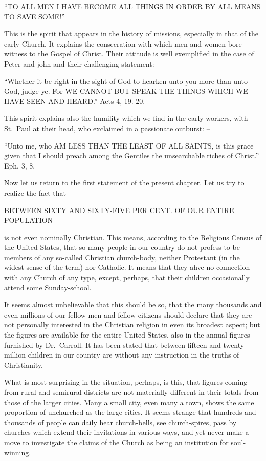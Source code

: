 \documentclass[
]{book}
\begin{document}
``TO ALL MEN I HAVE BECOME ALL THINGS IN ORDER BY ALL MEANS TO SAVE SOME!''

This is the spirit that appears in the history of missions, especially in that of the early Church. It explains the consecration with which men and women bore witness to the Gospel of Christ. Their attitude is well exemplified in the case of Peter and john and their challenging statement: --

``Whether it be right in the sight of God to hearken unto you more than unto God, judge ye. For WE CANNOT BUT SPEAK THE THINGS WHICH WE HAVE SEEN AND HEARD.'' Acts 4, 19. 20.

This spirit explains also the humility which we find in the early workers, with St.~Paul at their head, who exclaimed in a passionate outburst: --

``Unto me, who AM LESS THAN THE LEAST OF ALL SAINTS, is this grace given that I should preach among the Gentiles the unsearchable riches of Christ.'' Eph. 3, 8.

Now let us return to the first statement of the present chapter. Let us try to realize the fact that

\begin{center} BETWEEN SIXTY AND SIXTY-FIVE PER CENT. OF OUR ENTIRE POPULATION \end{center}

is not even nominally Christian. This means, according to the Religious Census of the United States, that so many people in our country do not profess to be members of any so-called Christian church-body, neither Protestant (in the widest sense of the term) nor Catholic. It means that they ahve no connection with any Church of any type, except, perhaps, that their children occasionally attend some Sunday-school.

It seems almost unbelievable that this should be so, that the many thousands and even millions of our fellow-men and fellow-citizens should declare that they are not personally interested in the Christian religion in even its broadest aspect; but the figures are available for the entire United States, also in the annual figures furnished by Dr.~Carroll. It has been stated that between fifteen and twenty million children in our country are without any instruction in the truths of Christianity.

What is most surprising in the situation, perhaps, is this, that figures coming from rural and semirural districts are not materially different in their totals from those of the larger cities. Many a small city, even many a town, shows the same proportion of unchurched as the large cities. It seems strange that hundreds and thousands of people can daily hear church-bells, see church-spires, pass by churches which extend their invitations in various ways, and yet never make a move to investigate the claims of the Church as being an institution for soul-winning.
\end{document}
